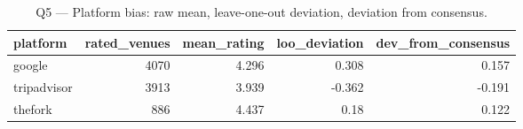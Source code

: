 \begin{table}[ht]
\centering
\caption{Q5 — Platform bias: raw mean, leave-one-out deviation, deviation from consensus.}
\label{tab:q5_platform_bias}
{\tiny
\begin{tabular}{lrrrr}
\toprule
platform & rated\_venues & mean\_rating & loo\_deviation & dev\_from\_consensus \\
\midrule
google & 4070 & 4.296 & 0.308 & 0.157 \\
tripadvisor & 3913 & 3.939 & -0.362 & -0.191 \\
thefork & 886 & 4.437 & 0.18 & 0.122 \\
\bottomrule
\end{tabular}
}
\end{table}

